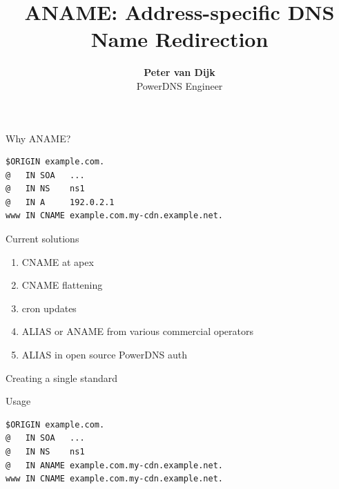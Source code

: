 \documentclass{beamer}
\title[aname]{ANAME: Address-specific DNS Name Redirection}
\author{\textbf{Peter van Dijk}\\PowerDNS Engineer}
\date{}
\begin{document}
\begin{frame}
  \titlepage
\end{frame}

\begin{frame}[fragile]{Why ANAME?}
  \begin{verbatim}
$ORIGIN example.com.
@   IN SOA   ...
@   IN NS    ns1
@   IN A     192.0.2.1
www IN CNAME example.com.my-cdn.example.net.
  \end{verbatim}
\end{frame}

\begin{frame}{Current solutions}
  \begin{enumerate}
    \item CNAME at apex
    \item CNAME flattening
    \item cron updates
    \item ALIAS or ANAME from various commercial operators
    \item ALIAS in open source PowerDNS auth
  \end{enumerate}
\end{frame}

\begin{frame}{Creating a single standard}
\end{frame}

\begin{frame}[fragile]{Usage}
  \begin{verbatim}
$ORIGIN example.com.
@   IN SOA   ...
@   IN NS    ns1
@   IN ANAME example.com.my-cdn.example.net.
www IN CNAME example.com.my-cdn.example.net.
  \end{verbatim}
\end{frame}
\end{document}
